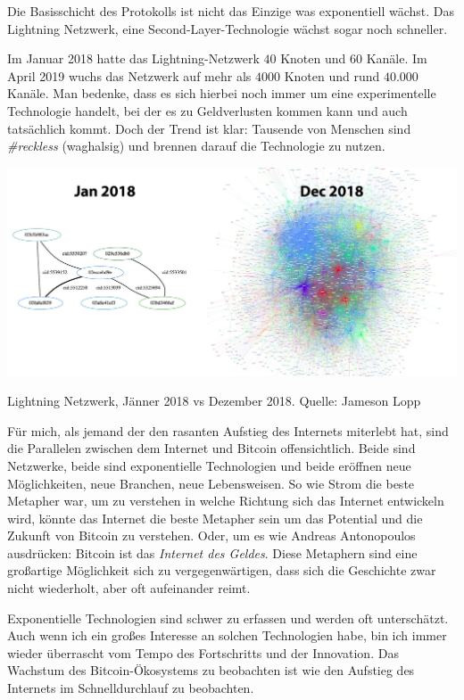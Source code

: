 Die Basisschicht des Protokolls ist nicht das Einzige was exponentiell wächst.
Das Lightning Netzwerk, eine Second-Layer-Technologie wächst sogar noch
schneller.

Im Januar 2018 hatte das Lightning-Netzwerk $40$ Knoten und $60$ Kanäle. Im
April 2019 wuchs das Netzwerk auf mehr als $4000$ Knoten und rund $40.000$
Kanäle. Man bedenke, dass es sich hierbei noch immer um eine experimentelle
Technologie handelt, bei der es zu Geldverlusten kommen kann und auch
tatsächlich kommt. Doch der Trend ist klar: Tausende von Menschen sind
\textit{\#reckless} (waghalsig) und brennen darauf die Technologie zu nutzen.

\begin{center}
  \includegraphics[width=\textwidth]{assets/images/lnd-growth-lopp-white.png}
  \caption{Lightning Netzwerk, Jänner 2018 vs Dezember 2018. Quelle: Jameson Lopp}
  \label{fig:lnd-growth-lopp-white.png}
\end{center}

Für mich, als jemand der den rasanten Aufstieg des Internets miterlebt hat, sind
die Parallelen zwischen dem Internet und Bitcoin offensichtlich. Beide sind
Netzwerke, beide sind exponentielle Technologien und beide eröffnen neue
Möglichkeiten, neue Branchen, neue Lebensweisen. So wie Strom die beste Metapher
war, um zu verstehen in welche Richtung sich das Internet entwickeln wird,
könnte das Internet die beste Metapher sein um das Potential und die Zukunft von
Bitcoin zu verstehen. Oder, um es wie Andreas Antonopoulos ausdrücken: Bitcoin
ist das \textit{Internet des Geldes}. Diese Metaphern sind eine großartige
Möglichkeit sich zu vergegenwärtigen, dass sich die Geschichte zwar nicht
wiederholt, aber oft aufeinander reimt.

Exponentielle Technologien sind schwer zu erfassen und werden oft unterschätzt.
Auch wenn ich ein großes Interesse an solchen Technologien habe, bin ich immer
wieder überrascht vom Tempo des Fortschritts und der Innovation. Das Wachstum
des Bitcoin-Ökosystems zu beobachten ist wie den Aufstieg des Internets im
Schnelldurchlauf zu beobachten.

